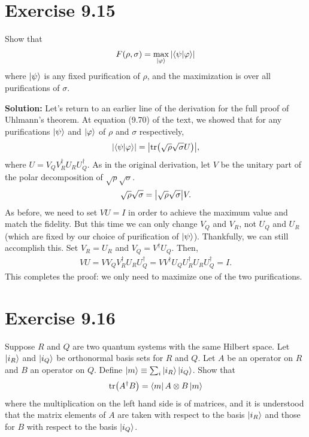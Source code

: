 \documentclass{book}
\begin{document}
\section*{Exercise 9.15}
    Show that
    \begin{align}
        F(\rho, \sigma) = \max_{\ket{\varphi}} \abs{\bra{\psi}\ket{\varphi}}
    \end{align}
    where $\ket{\psi}$ is any fixed purification of $\rho$, and the maximization is over all purifications of $\sigma$.
    
    \textbf{Solution:} Let's return to an earlier line of the derivation for the full proof of Uhlmann's theorem. At equation (9.70) of the text, we showed that for any purifications $\ket{\psi}$ and $\ket{\varphi}$ of $\rho$ and $\sigma$ respectively,
    \begin{align}
        \abs{\bra{\psi}\ket{\varphi}} = \abs{\tr(\sqrt{\rho}\sqrt{\sigma}U)},
    \end{align}
    where $U = V_Q V_R^\dagger U_R U_Q^\dagger$. As in the original derivation, let $V$ be the unitary part of the polar decomposition of $\sqrt{\rho}\sqrt{\sigma}$.
    \begin{align}
        \sqrt{\rho}\sqrt{\sigma} = \abs{\sqrt{\rho}\sqrt{\sigma}} V.
    \end{align}
    As before, we need to set $VU=I$ in order to achieve the maximum value and match the fidelity. But this time we can only change $V_Q$ and $V_R$, not $U_Q$ and $U_R$ (which are fixed by our choice of purification of $\ket{\psi}$). Thankfully, we can still accomplish this. Set $V_R = U_R$ and $V_Q = V^\dagger U_Q$. Then,
    \begin{align}
        VU = V V_Q V_R^\dagger U_R U_Q^\dagger = V V^\dagger U_Q U_R^\dagger U_R U_Q^\dagger = I.
    \end{align}
    This completes the proof: we only need to maximize one of the two purifications.
    
\section*{Exercise 9.16}
    Suppose $R$ and $Q$ are two quantum systems with the same Hilbert space. Let $\ket{i_R}$ and $\ket{i_Q}$ be orthonormal basis sets for $R$ and $Q$. Let $A$ be an operator on $R$ and $B$ an operator on $Q$. Define $\ket{m} \equiv \sum_i \ket{i_R}\ket{i_Q}$. Show that
    \begin{align}
        \tr(A^\dagger B) = \bra{m} A \otimes B \ket{m}
    \end{align}
    where the multiplication on the left hand side is of matrices, and it is understood that the matrix elements of $A$ are taken with respect to the basis $\ket{i_R}$ and those for $B$ with respect to the basis $\ket{i_Q}$.
    
\end{document}
